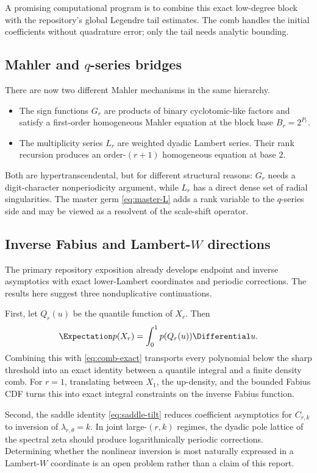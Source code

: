 \documentclass[11pt,oneside]{article}
\theoremstyle{definition}
\theoremstyle{remark}
\begin{document}
A promising computational program is to combine this exact low-degree block
with the repository's global Legendre tail estimates.  The comb handles the
initial coefficients without quadrature error; only the tail needs analytic
bounding.

\subsection{Mahler and \texorpdfstring{$q$}{q}-series bridges}

There are now two different Mahler mechanisms in the same hierarchy.

\begin{itemize}
\item The sign functions $G_r$ are products of binary cyclotomic-like factors
and satisfy a first-order homogeneous Mahler equation at the block base
$B_r=2^{P_r}$.
\item The multiplicity series $L_r$ are weighted dyadic Lambert series.  Their
rank recursion produces an order-$(r+1)$ homogeneous equation at base $2$.
\end{itemize}

Both are hypertranscendental, but for different structural reasons: $G_r$
needs a digit-character nonperiodicity argument, while $L_r$ has a direct
dense set of radial singularities.  The master germ \eqref{eq:master-L}
adds a rank variable to the $q$-series side and may be viewed as a resolvent of
the scale-shift operator.

\subsection{Inverse Fabius and Lambert-\texorpdfstring{$W$}{W} directions}

The primary repository exposition already develops endpoint and inverse
asymptotics with exact lower-Lambert coordinates and periodic corrections.
The results here suggest three nonduplicative continuations.

First, let $Q_r(u)$ be the quantile function of $X_r$.  Then
\[
 \Expectation p(X_r)=\int_0^1p(Q_r(u))\Differential u.
\]
Combining this with \eqref{eq:comb-exact} transports every polynomial below
the sharp threshold into an exact identity between a quantile integral and a
finite density comb.  For $r=1$, translating between $X_1$, the up-density,
and the bounded Fabius CDF turns this into exact integral constraints on the
inverse Fabius function.

Second, the saddle identity \eqref{eq:saddle-tilt} reduces coefficient
asymptotics for $C_{r,k}$ to inversion of
$\lambda_{r,\theta}=k$.  In joint large-$(r,k)$ regimes, the dyadic pole
lattice of the spectral zeta should produce logarithmically periodic
corrections.  Determining whether the nonlinear inversion is most naturally
expressed in a Lambert-$W$ coordinate is an open problem rather than a claim
of this report.
\end{document}

